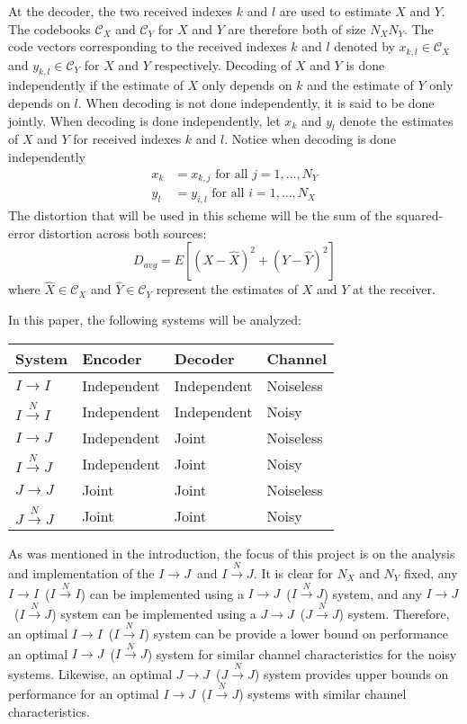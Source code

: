 \documentclass[10pt]{article}
\newcommand{\sysIIN}{\mbox{$I \overset{N}{\rightarrow} I$}}
\newcommand{\sysII}{\mbox{$I \rightarrow I$}}
\newcommand{\sysIJN}{\mbox{$I \overset{N}{\rightarrow} J$}}
\newcommand{\sysIJ}{\mbox{$I \rightarrow J$}}
\newcommand{\sysJJN}{\mbox{$J \overset{N}{\rightarrow} J$}}
\newcommand{\sysJJ}{\mbox{$J \rightarrow J$}}
\begin{document}
At the decoder, the two received indexes $k$ and $l$ are used to estimate $X$ and $Y$. The codebooks $\mathcal{C}_X$ and $\mathcal{C}_Y$ for $X$ and $Y$ are therefore both of size $N_X N_Y$. The code vectors corresponding to the received indexes $k$ and $l$ denoted by $x_{k,l} \in \mathcal{C}_X$ and $y_{k,l} \in \mathcal{C}_Y$ for $X$ and $Y$ respectively. Decoding of $X$ and $Y$ is done independently if the estimate of $X$ only depends on $k$ and the estimate of $Y$ only depends on $l$. When decoding is not done independently, it is said to be done jointly. When decoding is done independently, let $x_k$ and $y_l$ denote the estimates of $X$ and $Y$ for received indexes $k$ and $l$. Notice when decoding is done independently
\begin{align}
x_k &= x_{k,j} \text{ for all } j=1,\ldots,N_Y \\
y_l &= y_{i,l} \text{ for all } i=1,\ldots,N_X
\end{align}
The distortion that will be used in this scheme will be the sum of the squared-error distortion across both sources:
\begin{equation}
    D_{avg} = E[{(X-\hat{X})}^2 + {(Y-\hat{Y})}^2]
\end{equation}
where $\hat{X} \in \mathcal{C}_X$ and $\hat{Y} \in \mathcal{C}_Y$ represent the estimates of $X$ and $Y$ at the receiver.

In this paper, the following systems will be analyzed:

\begin{center}
    \begin{tabular}{| l | l | l | l |}
    \hline
    \bf System & \bf Encoder & \bf Decoder & \bf Channel \\ \hline \hline
    \sysII & Independent & Independent & Noiseless \\ \hline
    \sysIIN & Independent & Independent & Noisy \\ \hline
    \sysIJ & Independent & Joint & Noiseless \\ \hline
    \sysIJN & Independent & Joint & Noisy \\ \hline
    \sysJJ & Joint & Joint & Noiseless \\ \hline
    \sysJJN & Joint & Joint & Noisy \\ \hline
    \end{tabular}
\end{center}

As was mentioned in the introduction, the focus of this project is on the analysis and implementation of the \sysIJ\ and \sysIJN. It is clear for $N_X$ and $N_Y$ fixed, any \sysII\ (\sysIIN) can be implemented using a \sysIJ\ (\sysIJN) system, and any \sysIJ\ (\sysIJN) system can be implemented using a \sysJJ\ (\sysJJN) system. Therefore, an optimal \sysII\ (\sysIIN) system can be  provide a lower bound on performance an optimal \sysIJ\ (\sysIJN) system for similar channel characteristics for the noisy systems. Likewise, an optimal \sysJJ\ (\sysJJN) system provides upper bounds on performance for an optimal \sysIJ\ (\sysIJN) systems with similar channel characteristics.
\end{document}
